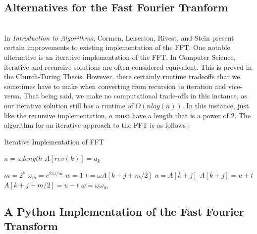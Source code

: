 \documentclass{amsproc}
\begin{document}
\subsection{Alternatives for the Fast Fourier Tranform}

\mbox{}	 \\
\indent In \textit{Introduction to Algorithms}, Cormen, Leiserson, Rivest, and Stein present certain improvements to existing implementation of the FFT. One notable alternative is an iterative implementation of the FFT. In Computer Science, iterative and recursive solutions are often considered equivalent. This is proved in the Church-Turing Thesis. However, there certainly runtime tradeoffs that we sometimes have to make when converting from recursion to iteration and vice-versa. That being said, we make no computational trade-offs in this instance, as our iterative solution still has a runtime of $O(nlog(n))$. In this instance, just like the recursive implementation, $a$ must have a length that is a power of 2. The algorithm for an iterative approach to the FFT is as follows \cite{Cormen}:

\begin{algorithm}
\caption{Iterative Implementation of FFT}\label{it-fft}
\begin{algorithmic}[1]

\State $n = a.length$
	\State $A[rev(k)] = a_k$ 
\EndFor

\EndProcedure


\State {}
	\State $m = 2^s$
	\State $\omega_m = e^{2 \pi i / m}$
		\State $w = 1$
			\State $t = \omega A[k + j + m/2]$
			\State $u = A[k+j]$
			\State $A[k+j] = u + t$
			\State $A[k+j+m/2] = u - t$
			\State $\omega = \omega \omega_m$
		\EndFor
	\EndFor
\EndFor

\EndProcedure

\end{algorithmic}
\end{algorithm}

\subsection{A Python Implementation of the Fast Fourier Transform}
\end{document}
